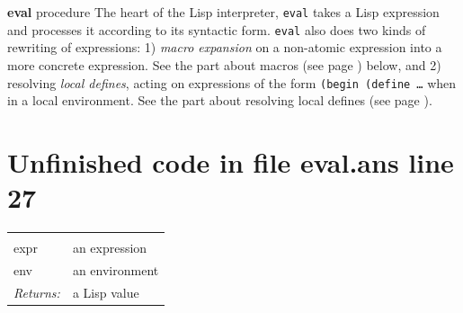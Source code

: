 \documentclass[twoside,9pt]{report}
\begin{document}
\textbf{eval} procedure The heart of the Lisp interpreter, \texttt{eval} takes a Lisp expression and processes it according to its syntactic form. \texttt{eval} also does two kinds of rewriting of expressions: 1) \emph{macro expansion} on a non-atomic expression into a more concrete expression. See the part about macros (see page \pageref{macros}) below, and 2) resolving \emph{local defines}, acting on expressions of the form \texttt{(begin (define \ldots } when in a local environment. See the part about resolving local defines (see page \pageref{resolving-local-defines}).

\section{Unfinished code in file eval.ans line 27}
\noindent\begin{tabular}{ |p{1.9cm} p{8cm}| }
\hline
\rowcolor[HTML]{CCCCCC} \multicolumn{2}{|l|}{\bf eval (public)} \\
expr & an expression \\
env & an environment \\
\textit{Returns:} & a Lisp value \\
\hline
\end{tabular}
\end{document}

